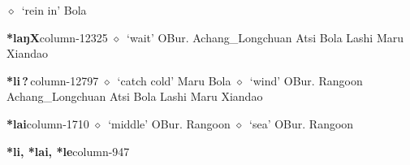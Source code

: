          $\diamond$~`rein in'
         Bola 
  \item {\footnotesize \textbf{*laŋX}}{\tiny column-12325}
         $\diamond$~`wait'
         OBur. 
\hspace{1ex}
         Achang\_Longchuan 
\hspace{1ex}
         Atsi 
\hspace{1ex}
         Bola 
\hspace{1ex}
         Lashi 
\hspace{1ex}
         Maru 
\hspace{1ex}
         Xiandao 
  \item {\footnotesize \textbf{*li\,?\,}}{\tiny column-12797}
         $\diamond$~`catch cold'
         Maru 
\hspace{1ex}
         Bola 
\hspace{1ex}
         $\diamond$~`wind'
         OBur. 
\hspace{1ex}
         Rangoon 
\hspace{1ex}
         Achang\_Longchuan 
\hspace{1ex}
         Atsi 
\hspace{1ex}
         Bola 
\hspace{1ex}
         Lashi 
\hspace{1ex}
         Maru 
\hspace{1ex}
         Xiandao 
  \item {\footnotesize \textbf{*lai}}{\tiny column-1710}
         $\diamond$~`middle'
         OBur. 
\hspace{1ex}
         Rangoon 
\hspace{1ex}
         $\diamond$~`sea'
         OBur. 
\hspace{1ex}
         Rangoon 
  \item {\footnotesize \textbf{*li, *lai, *le}}{\tiny column-947}
